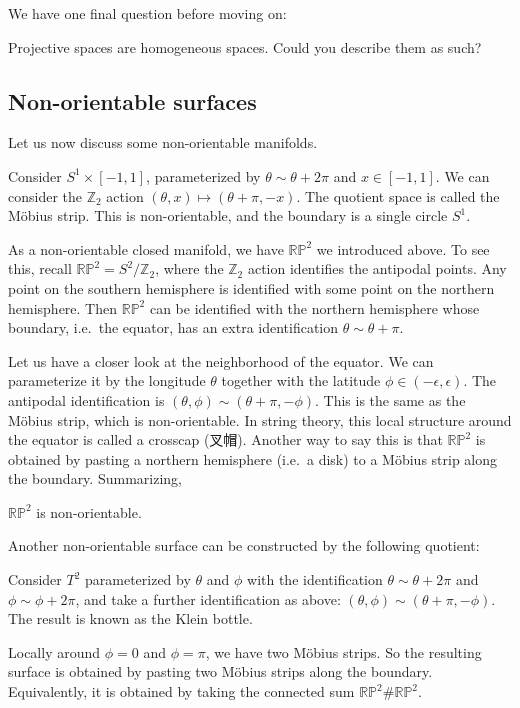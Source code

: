 \documentclass[12pt]{article}
\numberwithin{equation}{section}
\def\bZ{\mathbb{Z}}
\def\RP{\mathbb{RP}}
\begin{document}
We have one final question before moving on:
\begin{question}
Projective spaces are homogeneous spaces. Could you describe them as such?
\end{question}


\subsection{Non-orientable surfaces}

Let us now discuss some non-orientable manifolds.

\begin{example}
  Consider $S^1\times [-1,1]$, parameterized by $\theta\sim \theta+2\pi$ and $x\in [-1,1]$.
  We can consider the $\bZ_2$ action $(\theta,x)\mapsto (\theta+\pi,-x)$.
  The quotient space is called the M\"obius strip.
  This is non-orientable, and the boundary is a single circle $S^1$.
\end{example}

As a non-orientable closed manifold, 
we have $\RP^2$ we introduced above. To see this, recall $\RP^2=S^2/\bZ_2$,
where the $\bZ_2$ action identifies the antipodal points. 
Any point on the southern hemisphere is identified with some point on the northern hemisphere.
Then $\RP^2$ can be identified with the northern hemisphere
whose boundary, i.e.~the equator, has an extra identification $\theta \sim \theta+\pi$.

Let us have a closer look at the neighborhood of the equator.
We can parameterize it by the longitude $\theta$ together with the latitude $\phi\in (-\epsilon,\epsilon)$.
The antipodal identification is $(\theta,\phi)\sim (\theta+\pi,-\phi)$.
This is the same as the M\"obius strip, which is non-orientable.
In string theory, this local structure around the equator is called a crosscap (叉帽).
Another way to say this is that $\RP^2$ is obtained by pasting a northern hemisphere (i.e.~a disk)
to a M\"obius strip along the boundary.
Summarizing,
\begin{proposition}
$\RP^2$ is non-orientable.
\end{proposition}

Another non-orientable surface can be constructed by the following quotient:
\begin{example}
Consider $T^2$ parameterized by $\theta$ and $\phi$
with the identification $\theta\sim \theta+2\pi$ and $\phi \sim \phi+2\pi$,
and take a further identification as above: $(\theta,\phi)\sim (\theta+\pi,-\phi)$.
The result is known as the Klein bottle.
\end{example}
Locally around $\phi=0$ and $\phi=\pi$, we have two M\"obius strips.
So the resulting surface is obtained by pasting two M\"obius strips along the boundary.
Equivalently, it is obtained by taking the connected sum $\RP^2\#\RP^2$.
\end{document}
